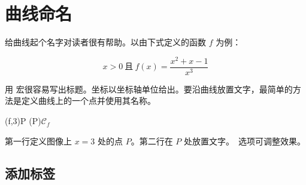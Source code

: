 \section{曲线命名}

给曲线起个名字对读者很有帮助。以由下式定义的函数 $f$ 为例：

\[
   x>0\ \text{且}\ f(x)=\dfrac{x^2+x-1}{x^3}
\]

用  宏很容易写出标题。坐标以坐标轴单位给出。要沿曲线放置文字，最简单的方法是定义曲线上的一个点并使用其名称。

\begin{tkzltxexample}[num]
  \tkzFnDefPoint(f,3){P}
  (P){${\mathcal{C}}_f$}
\end{tkzltxexample}

第一行定义图像上 $x=3$ 处的点 $P$。第二行在 $P$ 处放置文字。\TIKZ\ 选项可调整效果。

\subsection{添加标签}

\begin{center}
\begin{tkzexample}[vbox]
\end{tkzexample}
\end{center}

\endinput
